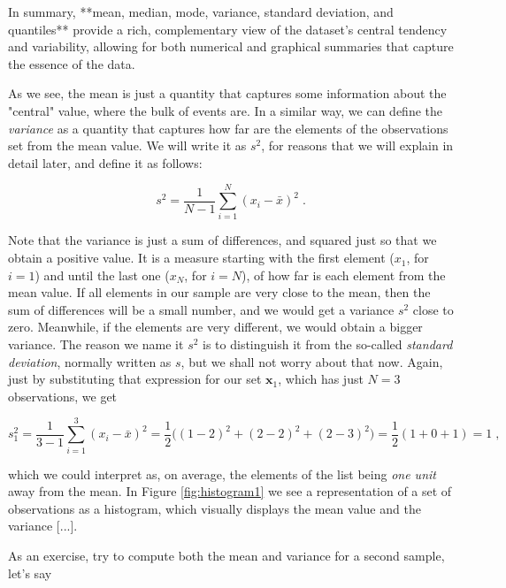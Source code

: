 \documentclass{book}
\begin{document}
In summary, **mean, median, mode, variance, standard deviation, and quantiles** provide a rich, complementary view of the dataset’s central tendency and variability, allowing for both numerical and graphical summaries that capture the essence of the data.

\newpage
	
As we see, the mean is just a quantity that captures some information about the "central" value, where the bulk of events are. In a similar way, we can define the \textit{variance} as a quantity that captures how far are the elements of the observations set from the mean value. We will write it as $s^2$, for reasons that we will explain in detail later, and define it as follows:

\begin{equation}
	s^2 = \frac{1}{N - 1} \sum_{i = 1}^{N} (x_{i} - \bar{x})^{2} \; . 
\end{equation}

Note that the variance is just a sum of differences, and squared just so that we obtain a positive value. It is a measure starting with the first element ($x_1$, for $i = 1$) and until the last one ($x_N$, for $i = N$), of how far is each element from the mean value. If all elements in our sample are very close to the mean, then the sum of differences will be a small number, and we would get a variance $s^2$ close to zero. Meanwhile, if the elements are very different, we would obtain a bigger variance. The reason we name it $s^2$ is to distinguish it from the so-called \textit{standard deviation}, normally written as $s$, but we shall not worry about that now. Again, just by substituting that expression for our set $\textbf{x}_1$, which has just $N = 3$ observations, we get

\begin{equation}
	s_1^2 = \frac{1}{3 - 1} \sum_{i = 1}^{3} (x_{i} - \bar{x})^{2} = \frac{1}{2} \big((1 - 2)^{2} + (2 - 2)^{2} + (2 - 3)^{2}\big) = \frac{1}{2} (1 + 0 + 1) = 1 \; , \nonumber
\end{equation}

which we could interpret as, on average, the elements of the list being \textit{one unit} away from the mean. In Figure \ref{fig:histogram1} we see a representation of a set of observations as a histogram, which visually displays the mean value and the variance [...].

\medskip

As an exercise, try to compute both the mean and variance for a second sample, let's say
\end{document}
